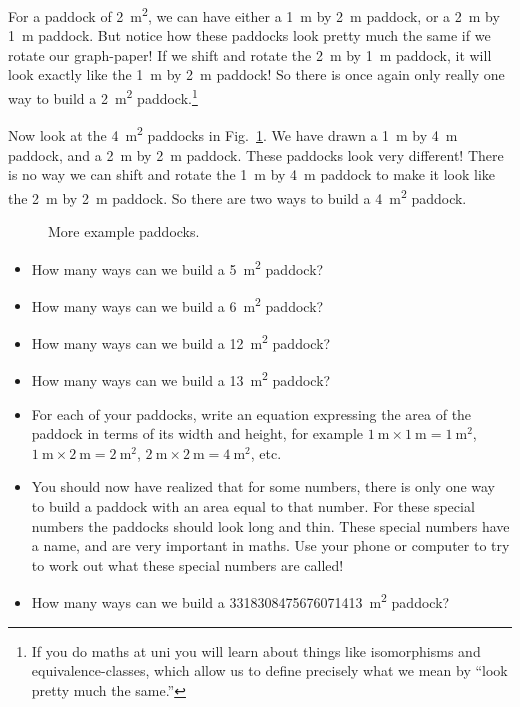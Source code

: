 \documentclass{article}
\begin{document}
For a paddock of \SI{2}{\meter\squared}, we can have either a \SI{1}{\meter} by \SI{2}{\meter} paddock, or a \SI{2}{\meter} by \SI{1}{\meter} paddock. But notice how these paddocks look pretty much the same if we rotate our graph-paper! If we shift and rotate the \SI{2}{\meter} by \SI{1}{\meter} paddock, it will look exactly like the \SI{1}{\meter} by \SI{2}{\meter} paddock! So there is once again only really one way to build a \SI{2}{\meter\squared} paddock.\footnote{If you do maths at uni you will learn about things like isomorphisms and equivalence-classes, which allow us to define precisely what we mean by ``look pretty much the same.''}

Now look at the \SI{4}{\meter\squared} paddocks in Fig.~\ref{Fig:more_example_paddocks}. We have drawn a \SI{1}{\meter} by \SI{4}{\meter} paddock, and a \SI{2}{\meter} by \SI{2}{\meter} paddock. These paddocks look very different! There is no way we can shift and rotate the \SI{1}{\meter} by \SI{4}{\meter} paddock to make it look like the \SI{2}{\meter} by \SI{2}{\meter} paddock. So there are two ways to build a \SI{4}{\meter\squared} paddock.

\begin{figure}[ht]
    \centering
    \caption{More example paddocks.}
    \label{Fig:more_example_paddocks}
\end{figure}

\begin{itemize}
    \item How many ways can we build a \SI{5}{\meter\squared} paddock?
    \item How many ways can we build a \SI{6}{\meter\squared} paddock?
    \item How many ways can we build a \SI{12}{\meter\squared} paddock?
    \item How many ways can we build a \SI{13}{\meter\squared} paddock?
    \item For each of your paddocks, write an equation expressing the area of the paddock in terms of its width and height, for example $\SI{1}{\meter}\times \SI{1}{\meter} = \SI{1}{\meter \squared}$, $\SI{1}{\meter}\times \SI{2}{\meter} = \SI{2}{\meter\squared}$, $\SI{2}{\meter}\times \SI{2}{\meter} = \SI{4}{\meter\squared}$, etc.
    \item You should now have realized that for some numbers, there is only one way to build a paddock with an area equal to that number. For these special numbers the paddocks should look long and thin. These special numbers have a name, and are very important in maths. Use your phone or computer to try to work out what these special numbers are called!
    \item How many ways can we build a \SI{3318308475676071413}{\meter\squared} paddock?
\end{itemize}
\end{document}
